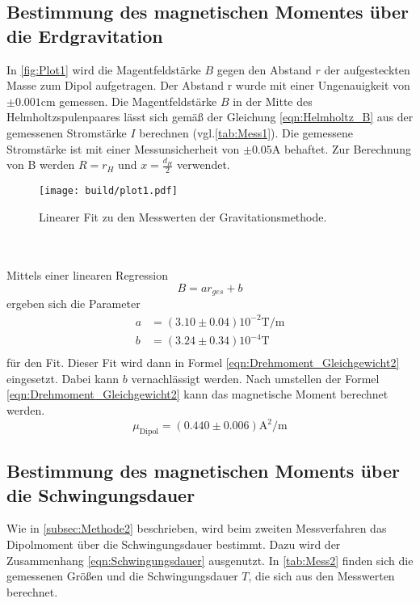 \subsection{Bestimmung des magnetischen Momentes über die Erdgravitation}
\label{subsec:AuswertungZu1}
In \autoref{fig:Plot1} wird die Magentfeldstärke $B$ gegen den Abstand $r$ der aufgesteckten Masse zum Dipol aufgetragen. Der Abstand r wurde mit einer Ungenauigkeit von $\pm 0.001\unit{\centi\metre}$ gemessen.
Die Magentfeldstärke $B$ in der Mitte des Helmholtzspulenpaares lässt sich gemäß der Gleichung \eqref{eqn:Helmholtz_B} aus der gemessenen Stromstärke $I$  berechnen (vgl.\autoref{tab:Mess1}). 
Die gemessene Stromstärke ist mit einer Messunsicherheit von $\pm 0.05\unit{\ampere}$ behaftet. Zur Berechnung von B werden $R = r_H$ und $x = \frac{d_H}{2}$ verwendet.
\begin{figure}
    \centering
    \texttt{[image: build/plot1.pdf]}
    \caption{Linearer Fit \cite{scipy} zu den Messwerten der Gravitationsmethode.}
    \label{fig:Plot1}
\end{figure} 
\\
\\
Mittels einer linearen Regression \cite{scipy} 
\begin{equation*}
    B = ar_{ges} + b
\end{equation*}
ergeben sich die Parameter 
\begin{align*}
    a &= (3.10 \pm 0.04) 10^{-2}\unit{\tesla\per\metre}\\
    b &= (3.24 \pm 0.34) 10^{-4} \unit{\tesla}\\
\end{align*}
für den Fit. Dieser Fit wird dann in Formel \eqref{eqn:Drehmoment_Gleichgewicht2} eingesetzt. Dabei kann $b$ vernachlässigt werden. Nach umstellen der Formel 
\eqref{eqn:Drehmoment_Gleichgewicht2} kann das magnetische Moment berechnet werden.
\begin{equation}
    \label{eqn:mu1}
    \mu_{\text{Dipol}} = (0.440 \pm 0.006) \unit{\square\ampere\per\metre}
\end{equation}

\subsection{Bestimmung des magnetischen Moments über die Schwingungsdauer}
\label{subsec:AuswertungZu2}

Wie in \autoref{subsec:Methode2} beschrieben, wird beim zweiten Messverfahren das Dipolmoment über die Schwingungsdauer bestimmt.
Dazu wird der Zusammenhang \eqref{eqn:Schwingungsdauer} ausgenutzt. In \autoref{tab:Mess2} finden sich die gemessenen Größen und die Schwingungsdauer $T$, die
sich aus den Messwerten berechnet. 

